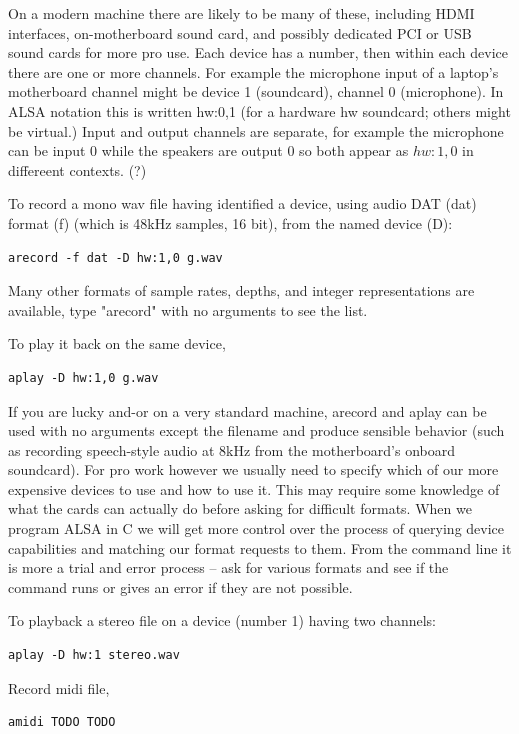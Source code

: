 \documentclass[oneside,english]{scrbook}
\begin{document}
On a modern machine there are likely to be many of these, including HDMI interfaces, on-motherboard sound card, and possibly dedicated PCI or USB sound cards for more pro use.   Each device has a number, then within each device there are one or more channels.   For example the microphone input of a laptop's motherboard channel might be device 1 (soundcard), channel 0 (microphone).  In ALSA notation this is written hw:0,1 (for a hardware hw soundcard; others might be virtual.)  Input and output channels are separate, for example the microphone can be input 0 while the speakers are output 0 so both appear as $hw:1,0$ in differeent contexts. (?)

To record a mono wav file having identified a device, using audio DAT (dat) format (f) (which is 48kHz samples, 16 bit), from the named device (D):
\begin{lstlisting}
arecord -f dat -D hw:1,0 g.wav          
\end{lstlisting}
Many other formats of sample rates, depths, and integer representations are available, type "arecord" with no arguments to see the list.

To play it back on the same device,
\begin{lstlisting}
aplay -D hw:1,0 g.wav
\end{lstlisting}

If you are lucky and-or on a very standard machine, arecord and aplay can be used with no arguments except the filename and produce sensible behavior (such as recording speech-style audio at 8kHz from the motherboard's onboard soundcard). For pro work however we usually need to specify which of our more expensive devices to use and how to use it.  This may require some knowledge of what the cards can actually do before asking for difficult formats.  When we program ALSA in C we will get more control over the process of querying device capabilities and matching our format requests to them.  From the command line it is more a trial and error process -- ask for various formats and see if the command runs or gives an error if they are not possible.

To playback a stereo file on a device (number 1) having two channels:
\begin{lstlisting}
aplay -D hw:1 stereo.wav
\end{lstlisting}

Record midi file,
\begin{lstlisting}
amidi TODO TODO
\end{lstlisting}
\end{document}
